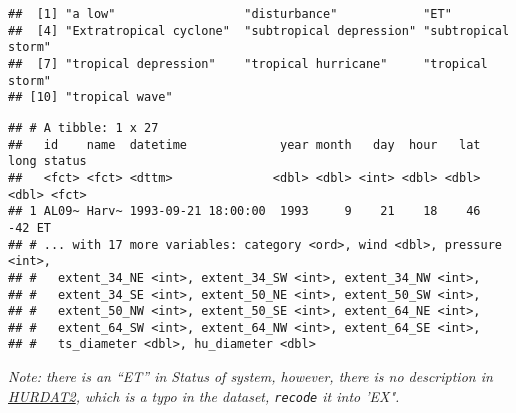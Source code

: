 \documentclass[]{book}
\newenvironment{Shaded}{\begin{snugshade}}{\end{snugshade}}
\newcommand{\CommentTok}[1]{\textcolor[rgb]{0.56,0.35,0.01}{\textit{#1}}}
\newcommand{\DataTypeTok}[1]{\textcolor[rgb]{0.13,0.29,0.53}{#1}}
\newcommand{\KeywordTok}[1]{\textcolor[rgb]{0.13,0.29,0.53}{\textbf{#1}}}
\newcommand{\NormalTok}[1]{#1}
\newcommand{\OperatorTok}[1]{\textcolor[rgb]{0.81,0.36,0.00}{\textbf{#1}}}
\newcommand{\StringTok}[1]{\textcolor[rgb]{0.31,0.60,0.02}{#1}}
\begin{document}
\begin{Shaded}
\end{Shaded}

\begin{verbatim}
##  [1] "a low"                  "disturbance"            "ET"                    
##  [4] "Extratropical cyclone"  "subtropical depression" "subtropical storm"     
##  [7] "tropical depression"    "tropical hurricane"     "tropical storm"        
## [10] "tropical wave"
\end{verbatim}

\begin{Shaded}
\end{Shaded}

\begin{verbatim}
## # A tibble: 1 x 27
##   id    name  datetime             year month   day  hour   lat  long status
##   <fct> <fct> <dttm>              <dbl> <dbl> <int> <dbl> <dbl> <dbl> <fct> 
## 1 AL09~ Harv~ 1993-09-21 18:00:00  1993     9    21    18    46   -42 ET    
## # ... with 17 more variables: category <ord>, wind <dbl>, pressure <int>,
## #   extent_34_NE <int>, extent_34_SW <int>, extent_34_NW <int>,
## #   extent_34_SE <int>, extent_50_NE <int>, extent_50_SW <int>,
## #   extent_50_NW <int>, extent_50_SE <int>, extent_64_NE <int>,
## #   extent_64_SW <int>, extent_64_NW <int>, extent_64_SE <int>,
## #   ts_diameter <dbl>, hu_diameter <dbl>
\end{verbatim}

\emph{Note: there is an ``ET'' in \emph{Status of system}, however, there is no description in \href{https://www.nhc.noaa.gov/data/hurdat/hurdat2-format-atlantic.pdf}{HURDAT2}, which is a typo in the dataset, \texttt{recode} it into 'EX".}

\begin{Shaded}
\end{Shaded}
\end{document}
